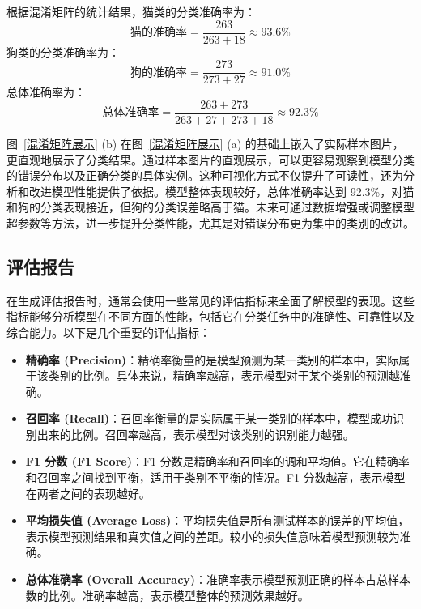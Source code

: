 根据混淆矩阵的统计结果，猫类的分类准确率为：
\[
\text{猫的准确率} = \frac{263}{263 + 18} \approx 93.6\%
\]
狗类的分类准确率为：
\[
\text{狗的准确率} = \frac{273}{273 + 27} \approx 91.0\%
\]
总体准确率为：
\[
\text{总体准确率} = \frac{263 + 273}{263 + 27 + 273 + 18} \approx 92.3\%
\]

图~\ref{混淆矩阵展示} (b) 在图~\ref{混淆矩阵展示}  (a) 的基础上嵌入了实际样本图片，更直观地展示了分类结果。通过样本图片的直观展示，可以更容易观察到模型分类的错误分布以及正确分类的具体实例。这种可视化方式不仅提升了可读性，还为分析和改进模型性能提供了依据。模型整体表现较好，总体准确率达到 92.3\%，对猫和狗的分类表现接近，但狗的分类误差略高于猫。未来可通过数据增强或调整模型超参数等方法，进一步提升分类性能，尤其是对错误分布更为集中的类别的改进。


\subsection{评估报告}
在生成评估报告时，通常会使用一些常见的评估指标来全面了解模型的表现。这些指标能够分析模型在不同方面的性能，包括它在分类任务中的准确性、可靠性以及综合能力。以下是几个重要的评估指标：

\begin{itemize}
    \item \textbf{精确率 (Precision)}：精确率衡量的是模型预测为某一类别的样本中，实际属于该类别的比例。具体来说，精确率越高，表示模型对于某个类别的预测越准确。
    
    \item \textbf{召回率 (Recall)}：召回率衡量的是实际属于某一类别的样本中，模型成功识别出来的比例。召回率越高，表示模型对该类别的识别能力越强。
    
    \item \textbf{F1 分数 (F1 Score)}：F1 分数是精确率和召回率的调和平均值。它在精确率和召回率之间找到平衡，适用于类别不平衡的情况。F1 分数越高，表示模型在两者之间的表现越好。
    
    \item \textbf{平均损失值 (Average Loss)}：平均损失值是所有测试样本的误差的平均值，表示模型预测结果和真实值之间的差距。较小的损失值意味着模型预测较为准确。
    
    \item \textbf{总体准确率 (Overall Accuracy)}：准确率表示模型预测正确的样本占总样本数的比例。准确率越高，表示模型整体的预测效果越好。
\end{itemize}

